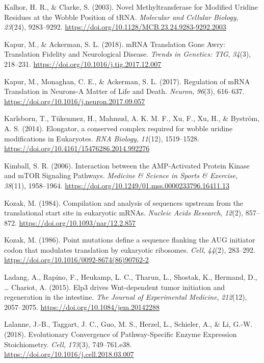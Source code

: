 \documentclass[12pt,openany]{book}
\begin{document}
\hypertarget{ref-Kalhor2003}{}
Kalhor, H. R., \& Clarke, S. (2003). Novel Methyltransferase for
Modified Uridine Residues at the Wobble Position of tRNA.
\emph{Molecular and Cellular Biology}, \emph{23}(24), 9283--9292.
\url{https://doi.org/10.1128/MCB.23.24.9283-9292.2003}

\hypertarget{ref-Kapur2018}{}
Kapur, M., \& Ackerman, S. L. (2018). mRNA Translation Gone Awry:
Translation Fidelity and Neurological Disease. \emph{Trends in Genetics:
TIG}, \emph{34}(3), 218--231.
\url{https://doi.org/10.1016/j.tig.2017.12.007}

\hypertarget{ref-Kapur2017}{}
Kapur, M., Monaghan, C. E., \& Ackerman, S. L. (2017). Regulation of
mRNA Translation in Neurons-A Matter of Life and Death. \emph{Neuron},
\emph{96}(3), 616--637.
\url{https://doi.org/10.1016/j.neuron.2017.09.057}

\hypertarget{ref-Karlsborn2014}{}
Karlsborn, T., Tükenmez, H., Mahmud, A. K. M. F., Xu, F., Xu, H., \&
Byström, A. S. (2014). Elongator, a conserved complex required for
wobble uridine modifications in Eukaryotes. \emph{RNA Biology},
\emph{11}(12), 1519--1528.
\url{https://doi.org/10.4161/15476286.2014.992276}

\hypertarget{ref-Kimball2006}{}
Kimball, S. R. (2006). Interaction between the AMP-Activated Protein
Kinase and mTOR Signaling Pathways. \emph{Medicine \& Science in Sports
\& Exercise}, \emph{38}(11), 1958--1964.
\url{https://doi.org/10.1249/01.mss.0000233796.16411.13}

\hypertarget{ref-Kozak1984}{}
Kozak, M. (1984). Compilation and analysis of sequences upstream from
the translational start site in eukaryotic mRNAs. \emph{Nucleic Acids
Research}, \emph{12}(2), 857--872.
\url{https://doi.org/10.1093/nar/12.2.857}

\hypertarget{ref-Kozak1986}{}
Kozak, M. (1986). Point mutations define a sequence flanking the AUG
initiator codon that modulates translation by eukaryotic ribosomes.
\emph{Cell}, \emph{44}(2), 283--292.
\url{https://doi.org/10.1016/0092-8674(86)90762-2}

\hypertarget{ref-Ladang2015}{}
Ladang, A., Rapino, F., Heukamp, L. C., Tharun, L., Shostak, K.,
Hermand, D., \ldots{} Chariot, A. (2015). Elp3 drives Wnt-dependent
tumor initiation and regeneration in the intestine. \emph{The Journal of
Experimental Medicine}, \emph{212}(12), 2057--2075.
\url{https://doi.org/10.1084/jem.20142288}

\hypertarget{ref-Lalanne2018}{}
Lalanne, J.-B., Taggart, J. C., Guo, M. S., Herzel, L., Schieler, A., \&
Li, G.-W. (2018). Evolutionary Convergence of Pathway-Specific Enzyme
Expression Stoichiometry. \emph{Cell}, \emph{173}(3), 749--761.e38.
\url{https://doi.org/10.1016/j.cell.2018.03.007}
\end{document}
